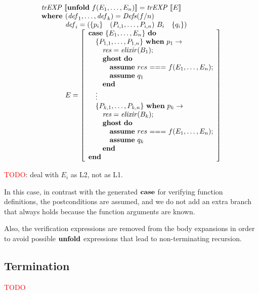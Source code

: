\[
\begin{array}{l}
\trEXP{\unfoldE~f(E_1,\dots,E_n)} = \trEXP{E}\\
\textbf{where } (\mathit{def}_1, \dots, \mathit{def}_k) = \Defs{f/n}\\
\phantom{\textbf{where }} \mathit{def}_i = \left(\{ p_i \}  \quad (P_{i,1}, \dots, P_{i,n})~B_i \quad \{ q_i \} \right) \\
\phantom{\textbf{where }} E = \left[\begin{array}{l}
\caseE~\{E_1,\dots,E_n\}~\doW \\
\quad \{P_{1,1},\dots,P_{1,n}\}~\whenE~p_1 \rightarrow\\ 
\quad\quad \mathit{res} = \mathit{elixir}(B_1); \\
\quad\quad \ghostE~\doW\\ 
\quad\quad\quad\assumeE~res~\mathit{===}~f(E_1,\dots,E_n);\\
\quad\quad\quad\assumeE~q_1\\
\quad\quad \Wend\\
\quad\vdots\\
\quad \{P_{k,1},\dots,P_{k,n}\}~\whenE~p_k \rightarrow\\ 
\quad\quad \mathit{res} = \mathit{elixir}(B_k); \\
\quad\quad \ghostE~\doW\\ 
\quad\quad\quad\assumeE~res~\mathit{===}~f(E_1,\dots,E_n);\\
\quad\quad\quad\assumeE~q_k\\
\quad\quad \Wend\\
\Wend
\end{array}
\right]
\end{array}
\]

\textcolor{red}{TODO}: deal with $E_i$ as L2, not as L1.

In this case, in contrast with the generated $\textbf{case}$ for verifying function
definitions, the postconditions are assumed, and we do not add an extra branch
that always holds because the function arguments are known.

Also, the verification expressions are removed from the body expansions in order
to avoid possible $\textbf{unfold}$ expressions that lead to non-terminating recursion.

\subsection{Termination}

\textcolor{red}{TODO}

